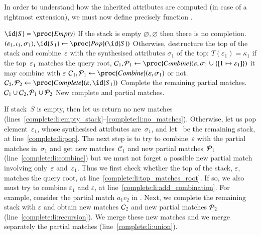 In order to understand how the inherited attributes are computed (in
case of a rightmost extension), we must now define precisely function
.
\begin{codebox}
\li\If \(\id{S} = \proc{Empty}\) \label{complete:li:empty_stack}
\RComment If the stack is empty
\li\Then \Return \(\varnothing, \varnothing\)
\label{complete:li:no_matches}
\RComment then there is no completion.
\End
\li\((\varepsilon_1, \iota_1, \sigma_1), \id{S_1}
          \gets \proc{Pop} (\id{S})\)
    \label{complete:li:pop}
\RComment Otherwise, destructure the top of the stack
\zi
\RComment and combine~\(\varepsilon\) with the synthesised attributes
\(\sigma_1\) of the top:
\li \If \(T(\varepsilon_1) = \kappa_1\)
\RComment if the top~\(\varepsilon_1\) matches the query root,
\label{complete:li:top_matches_root}
\li \Then \({\cal C}_1, {\cal P}_1
             \gets \proc{Combine} (\varepsilon, \sigma_1 \cup \{[1
             \mapsto \varepsilon_1]\})\)
\RComment it may combine with \(\varepsilon\)
\label{complete:li:add_combination}
\li \Else \({\cal C}_1, {\cal P}_1
             \gets \proc{Combine} (\varepsilon, \sigma_1)\)
\RComment or not.
    \label{complete:li:combine}
    \End
\li \({\cal C}_2, {\cal P}_2
       \gets \proc{Complete} (\varepsilon, \id{S_1})\)
    \label{complete:li:recursion}
\RComment Complete the remaining partial matches.
\li \Return \({\cal C}_1 \cup {\cal C}_2, {\cal P}_1 \cup {\cal P}_2\)
    \label{complete:li:union}
\RComment New complete and partial matches.
\end{codebox}
\noindent If stack~\(S\) is empty, then let us return no new matches
(lines~\ref{complete:li:empty_stack}--\ref{complete:li:no_matches}). Otherwise,
let us pop element~\(\varepsilon_1\), whose synthesised attributes
are~\(\sigma_1\), and let~ be the remaining stack, at
line~\ref{complete:li:pop}. The next step is to try to
combine~\(\varepsilon\) with the partial matches in~\(\sigma_1\) and
get new matches~\(\mathcal{C}_1\) and new partial matches~\({\cal
  P}_1\) (line~\ref{complete:li:combine}) but we must not forget a
possible new partial match involving only~\(\varepsilon\)
and~\(\varepsilon_1\). Thus we first check whether the top of the
stack, \(\varepsilon\), matches the query root, at
line~\ref{complete:li:top_matches_root}. If so, we also must try to
combine \(\varepsilon_1\) and \(\varepsilon\), at
line~\ref{complete:li:add_combination}. For example, consider the
partial match \(a_1c_2\) in . Next, we
complete the remaining stack  with \(\varepsilon\) and obtain
new matches \({\cal C}_2\) and new partial matches \({\cal P}_2\)
(line~\ref{complete:li:recursion}). We merge these new matches and we
merge separately the partial matches (line~\ref{complete:li:union}).


